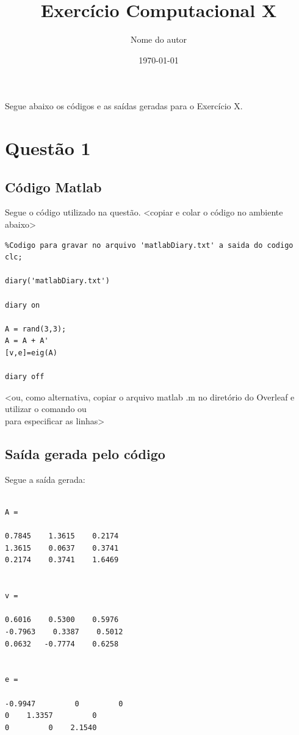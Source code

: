 \documentclass[a4paper,12pt]{article}
\title{Exercício Computacional X}
\author{Nome do autor}
\date{\today}
\begin{document}
\maketitle


Segue abaixo os códigos e as saídas geradas para o Exercício X.

\section{Questão 1}

\subsection*{Código Matlab}

Segue o código utilizado na questão.
<copiar e colar o código no ambiente abaixo>
\begin{lstlisting}
%Codigo para gravar no arquivo 'matlabDiary.txt' a saida do codigo
clc;

diary('matlabDiary.txt')

diary on

A = rand(3,3);
A = A + A'
[v,e]=eig(A)

diary off
\end{lstlisting}

<ou, como alternativa, copiar o arquivo matlab .m no diretório do Overleaf e utilizar o comando \verb|| ou\\ \verb|| para especificar as linhas>

\medskip

%





\subsection*{Saída gerada pelo código}

Segue a saída gerada:
\begin{lstlisting}

A =

0.7845    1.3615    0.2174
1.3615    0.0637    0.3741
0.2174    0.3741    1.6469


v =

0.6016    0.5300    0.5976
-0.7963    0.3387    0.5012
0.0632   -0.7774    0.6258


e =

-0.9947         0         0
0    1.3357         0
0         0    2.1540
\end{lstlisting}
\end{document}
